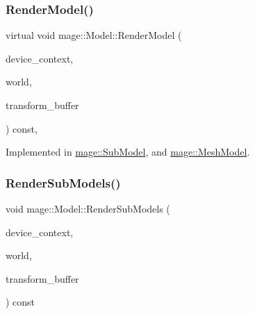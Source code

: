 \hypertarget{classmage_1_1_model_a2e455bf2998946d776b4056568a1c816}{}\label{classmage_1_1_model_a2e455bf2998946d776b4056568a1c816} 
\subsubsection{\texorpdfstring{Render\+Model()}{RenderModel()}}
{\footnotesize\ttfamily virtual void mage\+::\+Model\+::\+Render\+Model (\begin{DoxyParamCaption}\item[{I\+D3\+D11\+Device\+Context2 \&}]{device\+\_\+context,  }\item[{const \hyperlink{classmage_1_1_world}{World} \&}]{world,  }\item[{const \hyperlink{structmage_1_1_transform_buffer}{Transform\+Buffer} \&}]{transform\+\_\+buffer }\end{DoxyParamCaption}) const\hspace{0.3cm}{\ttfamily [protected]}, {}}



Implemented in \hyperlink{classmage_1_1_sub_model_a9dbfc5690b63cbf77d3e1d2c9a87d07a}{mage\+::\+Sub\+Model}, and \hyperlink{classmage_1_1_mesh_model_a3ea5bfb0599768712bbd2e46a7d2ff80}{mage\+::\+Mesh\+Model}.

\hypertarget{classmage_1_1_model_a8a713de6576beeeed5c28168b1f233e0}{}\label{classmage_1_1_model_a8a713de6576beeeed5c28168b1f233e0} 
\subsubsection{\texorpdfstring{Render\+Sub\+Models()}{RenderSubModels()}}
{\footnotesize\ttfamily void mage\+::\+Model\+::\+Render\+Sub\+Models (\begin{DoxyParamCaption}\item[{I\+D3\+D11\+Device\+Context2 \&}]{device\+\_\+context,  }\item[{const \hyperlink{classmage_1_1_world}{World} \&}]{world,  }\item[{const \hyperlink{structmage_1_1_transform_buffer}{Transform\+Buffer} \&}]{transform\+\_\+buffer }\end{DoxyParamCaption}) const\hspace{0.3cm}{\ttfamily [private]}}

